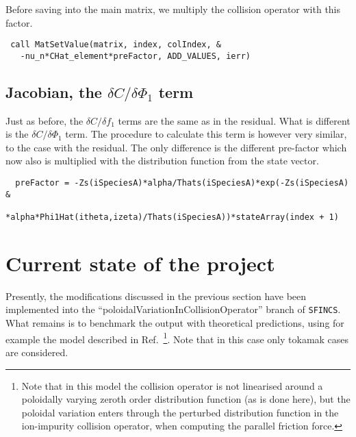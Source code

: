 \documentclass[12pt]{article}
\begin{document}
Before saving into the main matrix, we multiply the collision operator with this factor.

 \begin{lstlisting}
 call MatSetValue(matrix, index, colIndex, & 
   -nu_n*CHat_element*preFactor, ADD_VALUES, ierr)
  \end{lstlisting}

\subsection*{Jacobian, the $\delta C/\delta \Phi_1$ term}
Just as before, the   $\delta C/\delta f_1$ terms are the same as in the residual. What is different is the $\delta C/\delta \Phi_1$  term. The procedure to calculate this term is however very similar, to the case with the residual. The only difference is the different pre-factor which now also is multiplied with the distribution function from the state vector.

 \begin{lstlisting}
  preFactor = -Zs(iSpeciesA)*alpha/Thats(iSpeciesA)*exp(-Zs(iSpeciesA) &
            *alpha*Phi1Hat(itheta,izeta)/Thats(iSpeciesA))*stateArray(index + 1)
  \end{lstlisting}

\section*{Current state of the project}
Presently, the modifications discussed in the previous section have been implemented into the ``poloidalVariationInCollisionOperator'' branch of \texttt{SFINCS}. What remains is to benchmark the output with theoretical predictions, using for example the model described in Ref.~\cite{ref:Fulop}\footnote{Note that in this model the collision operator is not linearised around a poloidally varying zeroth order distribution function (as is done here), but the poloidal variation enters through the perturbed distribution function in the ion-impurity collision operator, when computing the parallel friction force.}. Note that in this case only tokamak cases are considered.
\end{document}

